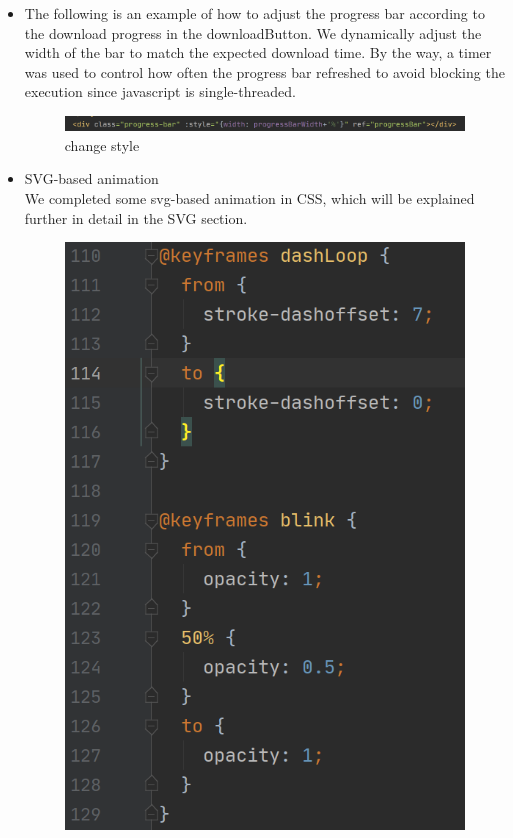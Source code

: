 \documentclass[11pt]{article}
\begin{document}
\begin{spacing}{1.0}
\begin{itemize}
		\item 
		The following is an example of how to adjust the progress bar according to the download progress in the downloadButton. We dynamically adjust the width of the bar to match the expected download time. By the way, a timer was used to control how often the progress bar refreshed to avoid blocking the execution since javascript is single-threaded.
\begin{figure}[H]
	\centering
	\includegraphics[scale=.5]{figures/css.png}
	\caption{change style}
	\label{fig:10}
\end{figure}

\item SVG-based animation\\
 We completed some svg-based animation in CSS, which will be explained further in detail in the SVG section.
 \begin{figure}[H]
 	\centering
 	\includegraphics[scale=.5]{figures/cssAnimation2.png}

\end{figure}
\end{itemize}
\end{spacing}
\end{document}
